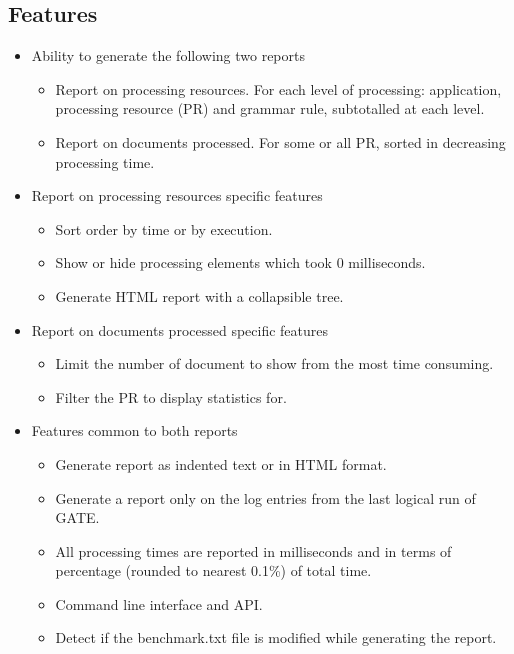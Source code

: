 \subsection{Features}

\begin{itemize}
  \item Ability to generate the following two reports
  \begin{itemize}
    \item Report on processing resources. For each level of processing:
    application, processing resource (PR) and grammar rule, subtotalled at each
    level.
    \item Report on documents processed. For some or all PR,
    sorted in decreasing processing time.
  \end{itemize}

  \item Report on processing resources specific features
  \begin{itemize}
    \item Sort order by time or by execution.
    \item Show or hide processing elements which took 0 milliseconds.
    \item Generate HTML report with a collapsible tree.
  \end{itemize}

  \item Report on documents processed specific features
  \begin{itemize}
    \item Limit the number of document to show from the most time consuming.
    \item Filter the PR to display statistics for.
  \end{itemize}

  \item Features common to both reports
  \begin{itemize}
    \item Generate report as indented text or in HTML format.
    \item Generate a report only on the log entries from the last logical
    run of GATE.
    \item All processing times are reported 
    in milliseconds and in terms of percentage (rounded to nearest 
    0.1\%) of total time.
    \item Command line interface and API.
    \item Detect if the benchmark.txt file is modified while generating
    the report. 
  \end{itemize}
\end{itemize}

